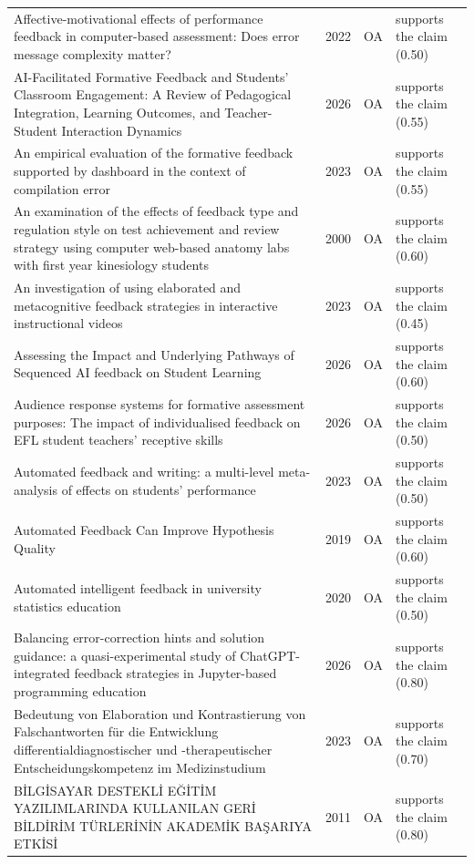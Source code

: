 \begin{longtable}{@{}%
  >{\raggedright\arraybackslash}p{}c%
  >{\raggedright\arraybackslash}p{}%
  >{\raggedright\arraybackslash}p{}@{}}
Affective-motivational effects of performance feedback in computer-based assessment: Does error message complexity matter? & 2022 & OA & supports the claim (0.50) \\
AI-Facilitated Formative Feedback and Students' Classroom Engagement: A Review of Pedagogical Integration, Learning Outcomes, and Teacher-Student Interaction Dynamics & 2026 & OA & supports the claim (0.55) \\
An empirical evaluation of the formative feedback supported by dashboard in the context of compilation error & 2023 & OA & supports the claim (0.55) \\
An examination of the effects of feedback type and regulation style on test achievement and review strategy using computer web-based anatomy labs with first year kinesiology students & 2000 & OA & supports the claim (0.60) \\
An investigation of using elaborated and metacognitive feedback strategies in interactive instructional videos & 2023 & OA & supports the claim (0.45) \\
Assessing the Impact and Underlying Pathways of Sequenced AI feedback on Student Learning & 2026 & OA & supports the claim (0.60) \\
Audience response systems for formative assessment purposes: The impact of individualised feedback on EFL student teachers' receptive skills & 2026 & OA & supports the claim (0.50) \\
Automated feedback and writing: a multi-level meta-analysis of effects on students' performance & 2023 & OA & supports the claim (0.50) \\
Automated Feedback Can Improve Hypothesis Quality & 2019 & OA & supports the claim (0.60) \\
Automated intelligent feedback in university statistics education & 2020 & OA & supports the claim (0.50) \\
Balancing error-correction hints and solution guidance: a quasi-experimental study of ChatGPT-integrated feedback strategies in Jupyter-based programming education & 2026 & OA & supports the claim (0.80) \\
Bedeutung von Elaboration und Kontrastierung von Falschantworten für die Entwicklung differentialdiagnostischer und -therapeutischer Entscheidungskompetenz im Medizinstudium & 2023 & OA & supports the claim (0.70) \\
BİLGİSAYAR DESTEKLİ EĞİTİM YAZILIMLARINDA KULLANILAN GERİ BİLDİRİM TÜRLERİNİN AKADEMİK BAŞARIYA ETKİSİ & 2011 & OA & supports the claim (0.80) \\

\end{longtable}
